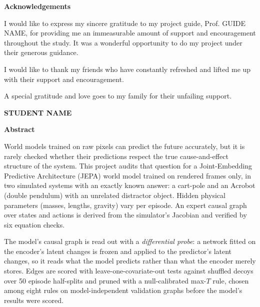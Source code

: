 \documentclass[11pt, a4paper, oneside,enumerate,textcomp]{report}
\newcommand{\StudentName}{STUDENT NAME}
\newcommand{\GuideName}{Prof. GUIDE NAME}
\begin{document}
\newpage
\begin{center}
	{\Large\bf Acknowledgements}
\end{center}
\par I would like to express my sincere gratitude to my project guide, \GuideName, for providing me an immeasurable amount of support and encouragement throughout the study. It was a wonderful opportunity to do my project under their generous guidance.

\par I would like to thank my friends who have constantly refreshed and lifted me up with their support and encouragement.

\par A special gratitude and love goes to my family for their unfailing support.

\vspace{1.5cm}
\begin{flushright}
	\textbf{\StudentName}
\end{flushright}


\newpage
\begin{center}
	{\Large\bf Abstract}
\end{center}

World models trained on raw pixels can predict the future accurately, but it is rarely checked whether their predictions respect the true cause-and-effect structure of the system. This project audits that question for a Joint-Embedding Predictive Architecture (JEPA) world model trained on rendered frames only, in two simulated systems with an exactly known answer: a cart-pole and an Acrobot (double pendulum) with an unrelated distractor object. Hidden physical parameters (masses, lengths, gravity) vary per episode. An expert causal graph over states and actions is derived from the simulator's Jacobian and verified by six equation checks.

The model's causal graph is read out with a \emph{differential probe}: a network fitted on the encoder's latent changes is frozen and applied to the predictor's latent changes, so it reads what the model predicts rather than what the encoder merely stores. Edges are scored with leave-one-covariate-out tests against shuffled decoys over 50 episode half-splits and pruned with a null-calibrated max-$T$ rule, chosen among eight rules on model-independent validation graphs before the model's results were scored.
\end{document}
